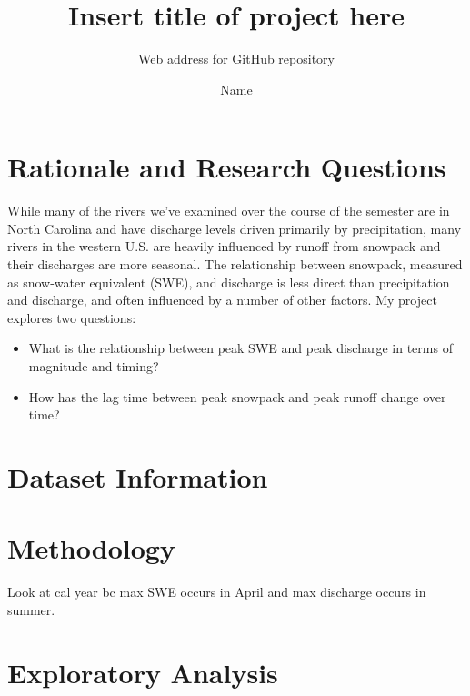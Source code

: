 \documentclass[
  12pt,
]{article}
\title{Insert title of project here}
\subtitle{Web address for GitHub repository}
\author{Name}
\date{}
\providecommand{\tightlist}{%
  \setlength{\itemsep}{0pt}\setlength{\parskip}{0pt}}
\begin{document}
\maketitle

\newpage

\hypertarget{rationale-and-research-questions}{%
\section{Rationale and Research
Questions}\label{rationale-and-research-questions}}

While many of the rivers we've examined over the course of the semester
are in North Carolina and have discharge levels driven primarily by
precipitation, many rivers in the western U.S. are heavily influenced by
runoff from snowpack and their discharges are more seasonal. The
relationship between snowpack, measured as snow-water equivalent (SWE),
and discharge is less direct than precipitation and discharge, and often
influenced by a number of other factors. My project explores two
questions:

\begin{itemize}
\tightlist
\item
  What is the relationship between peak SWE and peak discharge in terms
  of magnitude and timing?
\item
  How has the lag time between peak snowpack and peak runoff change over
  time?
\end{itemize}

\newpage

\hypertarget{dataset-information}{%
\section{Dataset Information}\label{dataset-information}}

\newpage

\hypertarget{methodology}{%
\section{Methodology}\label{methodology}}

Look at cal year bc max SWE occurs in April and max discharge occurs in
summer.

\newpage

\hypertarget{exploratory-analysis}{%
\section{Exploratory Analysis}\label{exploratory-analysis}}
\end{document}
